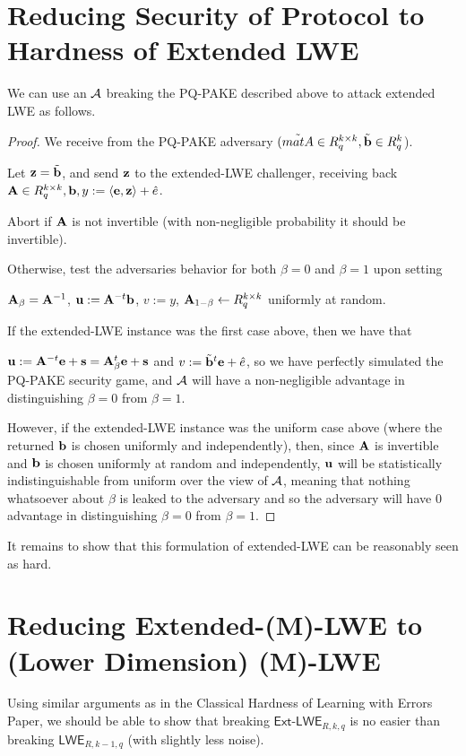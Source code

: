 \documentclass[oribibl,envcountsect,envcountsame]{llncs}
\begin{document}
\section{Reducing Security of Protocol to Hardness of Extended LWE}
\label{sec:proof-ext-lw}

We can use an $\mathcal{A}$ breaking the PQ-PAKE described above to attack extended LWE as follows. 


\begin{proof}We receive from the PQ-PAKE adversary $(\tilde{matA} \in R_q^{k \times k}, \tilde{\mathbf{b}} \in R_q^{k}$). 


Let $\mathbf{z} = \tilde{\mathbf{b}}$, and send $\mathbf{z}$ to the extended-LWE challenger, 
receiving back $\mathbf{A} \in R_q^{k \times k}, \mathbf{b}, y := \langle\mathbf{e}, \mathbf{z}\rangle+\hat{e}$. 

Abort if $\mathbf{A}$ is not invertible (with non-negligible probability it should be invertible).



Otherwise, test the adversaries behavior for both $\beta=0$ and $\beta=1$ upon setting

$\mathbf{A}_{\beta} = \mathbf{A}^{-1}$, $\mathbf{u} := \mathbf{A}^{-t}\mathbf{b}$, $v := y$,
$\mathbf{A}_{1-\beta} \gets R_q^{k \times k}$ uniformly at random.


If the extended-LWE instance was the first case above, then we have that 

$\mathbf{u} := \mathbf{A}^{-t}\mathbf{e}+\mathbf{s} = \mathbf{A}_{\beta}^{t}\mathbf{e}+\mathbf{s}$ and 
$v := \tilde{\mathbf{b}}^t\mathbf{e} + \hat{e}$, so we have perfectly simulated the PQ-PAKE security game, 
and $\mathcal{A}$ will have a non-negligible advantage in distinguishing $\beta=0$ from $\beta=1$. 


However, if the extended-LWE instance was the uniform case above (where the returned $\mathbf{b}$ is 
chosen uniformly and independently), then, since $\mathbf{A}$ is invertible and $\mathbf{b}$ is
chosen uniformly at random and independently, $\mathbf{u}$ will be statistically 
indistinguishable from uniform over the view of $\mathcal{A}$, meaning that nothing whatsoever about 
$\beta$ is leaked to the adversary and so the adversary will have 0 advantage in 
distinguishing $\beta=0$ from $\beta=1$. 
\end{proof}

It remains to show that this formulation of extended-LWE can be reasonably seen as hard. 

\section{Reducing Extended-(M)-LWE to (Lower Dimension) (M)-LWE}
\label{sec:red-ext-lwe-lwe}
Using similar arguments as in the Classical Hardness of Learning with Errors Paper, we should 
be able to show that breaking $\textsf{Ext-LWE}_{R,k,q}$ is no easier than breaking 
$\textsf{LWE}_{R,k-1,q}$ (with slightly less noise).
\end{document}
